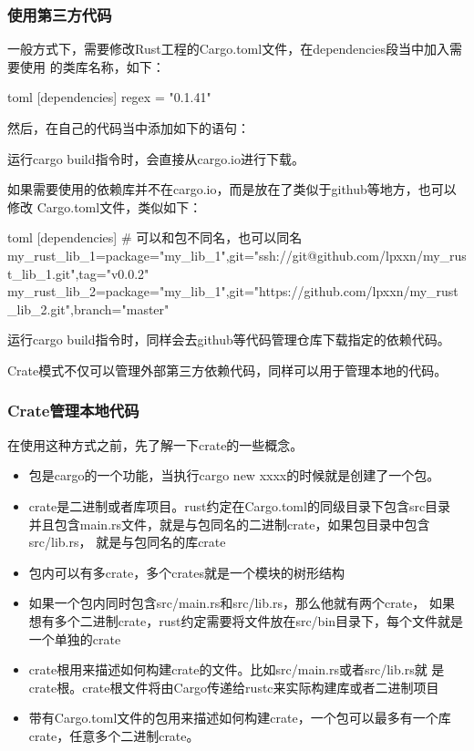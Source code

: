 \subsubsection{使用第三方代码}
一般方式下，需要修改Rust工程的Cargo.toml文件，在dependencies段当中加入需要使用
的类库名称，如下：
\begin{code-block}{toml}
[dependencies]
regex = "0.1.41"
\end{code-block}
然后，在自己的代码当中添加如下的语句：
运行cargo build指令时，会直接从cargo.io进行下载。

如果需要使用的依赖库并不在cargo.io，而是放在了类似于github等地方，也可以修改
Cargo.toml文件，类似如下：
\begin{code-block}{toml}
[dependencies]
# 可以和包不同名，也可以同名
my_rust_lib_1={package="my_lib_1",git="ssh://git@github.com/lpxxn/my_rust_lib_1.git",tag="v0.0.2"}
my_rust_lib_2={package="my_lib_1",git="https://github.com/lpxxn/my_rust_lib_2.git",branch="master"}
\end{code-block}
运行cargo build指令时，同样会去github等代码管理仓库下载指定的依赖代码。

Crate模式不仅可以管理外部第三方依赖代码，同样可以用于管理本地的代码。

\subsubsection{Crate管理本地代码}
在使用这种方式之前，先了解一下crate的一些概念。
\begin{itemize}
  \item 包是cargo的一个功能，当执行cargo new xxxx的时候就是创建了一个包。
  \item crate是二进制或者库项目。rust约定在Cargo.toml的同级目录下包含src目录
并且包含main.rs文件，就是与包同名的二进制crate，如果包目录中包含src/lib.rs，
就是与包同名的库crate
  \item 包内可以有多crate，多个crates就是一个模块的树形结构
  \item 如果一个包内同时包含src/main.rs和src/lib.rs，那么他就有两个crate，
如果想有多个二进制crate，rust约定需要将文件放在src/bin目录下，每个文件就是
一个单独的crate
  \item crate根用来描述如何构建crate的文件。比如src/main.rs或者src/lib.rs就
是crate根。crate根文件将由Cargo传递给rustc来实际构建库或者二进制项目
  \item 带有Cargo.toml文件的包用来描述如何构建crate，一个包可以最多有一个库
crate，任意多个二进制crate。
\end{itemize}

